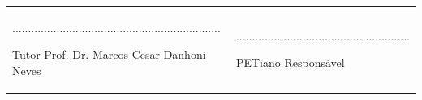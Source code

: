 \documentclass[a4paper,12pt]{report}
\begin{document}
\begin{center}
	\begin{tabular}{m{7cm}m{7cm}}
		\begin{flushleft}
		\begin{center} 
			..................................................................
						
			 Tutor Prof. Dr. Marcos Cesar Danhoni Neves		
		\end{center}
		\end{flushleft}
		&
		\begin{flushright}
		\begin{center}
			.......................................................
						
			 PETiano Responsável
		\end{center}		
		\end{flushright}
	\end{tabular}
\end{center}
\end{document}
